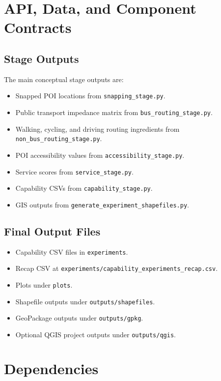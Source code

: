 \documentclass[11pt]{article}
\begin{document}
\section{API, Data, and Component Contracts}

\subsection*{Stage Outputs}

The main conceptual stage outputs are:

\begin{itemize}
  \item Snapped POI locations from \texttt{snapping\_stage.py}.
  \item Public transport impedance matrix from \texttt{bus\_routing\_stage.py}.
  \item Walking, cycling, and driving routing ingredients from \texttt{non\_bus\_routing\_stage.py}.
  \item POI accessibility values from \texttt{accessibility\_stage.py}.
  \item Service scores from \texttt{service\_stage.py}.
  \item Capability CSVs from \texttt{capability\_stage.py}.
  \item GIS outputs from \texttt{generate\_experiment\_shapefiles.py}.
\end{itemize}

\subsection*{Final Output Files}

\begin{itemize}
  \item Capability CSV files in \texttt{experiments}.
  \item Recap CSV at \texttt{experiments/capability\_experiments\_recap.csv}.
  \item Plots under \texttt{plots}.
  \item Shapefile outputs under \texttt{outputs/shapefiles}.
  \item GeoPackage outputs under \texttt{outputs/gpkg}.
  \item Optional QGIS project outputs under \texttt{outputs/qgis}.
\end{itemize}

\section{Dependencies}
\end{document}
